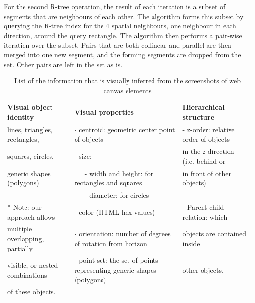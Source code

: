 For the second R-tree operation, the result of each iteration is a subset of segments that are neighbours of each other. The algorithm forms this subset by querying the R-tree index for the 4 spatial neighbours, one neighbour in each direction, around the query rectangle. The algorithm then performs a pair-wise iteration over the subset. Pairs that are both collinear and parallel are then merged into one new segment, and the forming segments are dropped from the set. Other pairs are left in the set as is.

\begin{table}
\setlength{\tabcolsep}{6pt}
\renewcommand{\arraystretch}{0.9}
\centering
\caption{List of the information that is visually inferred from the screenshots of web canvas elements}
\begin{tabular*}{0.99\textwidth}{l @{\extracolsep{\fill}} ll}
\toprule
\textbf{Visual object identity} &  \textbf{Visual properties}  &  \textbf{Hierarchical structure} \\

\midrule
lines, triangles, rectangles,  &  - centroid: geometric center point of objects & - z-order: relative order of objects \\

squares, circles, & - size: & in the z-direction (i.e. behind or \\

generic shapes (polygons) & \, \, \, - width and height: for rectangles and squares & in front of other objects) \\

 & \, \, \, - diameter: for circles &  \\ 
 
* Note: our approach allows  & - color (HTML hex values) & - Parent-child relation: which \\

multiple overlapping, partially  & - orientation: number of degrees of rotation from horizon & objects are contained inside  \\

visible, or nested combinations & - point-set: the set of points representing generic shapes (polygons) & other objects. \\

of these objects. & & \\ 
 
\bottomrule
\end{tabular*}
\label{tbl:info-provided-by-approach}
\end{table}


